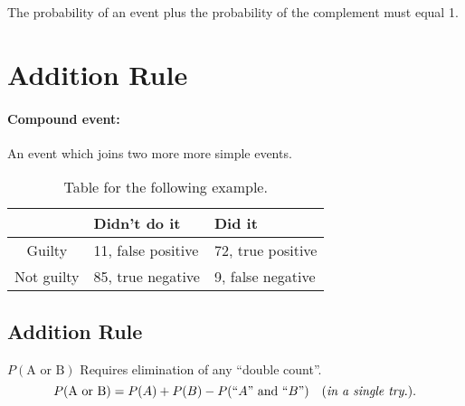 The probability of an event plus the probability of the complement must equal 1.


\section{Addition Rule}

\paragraph{Compound event:} An event which joins two more more simple events.


\begin{table}[htbp]
    \centering
    \begin{tabular}{c|p{3cm}|p{3cm}}
        \toprule
                 & Didn't do it & Did it  \\
        \midrule
        Guilty   & 11, false positive & 72, true positive\\
        \midrule
        Not guilty& 85, true negative & 9, false negative \\
        \bottomrule
    \end{tabular}
    \caption{Table for the following example.}
\end{table}


\subsection{Addition Rule}
$P(\text{A or B})$ Requires elimination of any ``double count''.
\[
P(\text{A or B}) = P(A) + P(B) - P(``A" \text{ and } ``B") \quad (\text{\textit{in a single try.}})
.\] 


